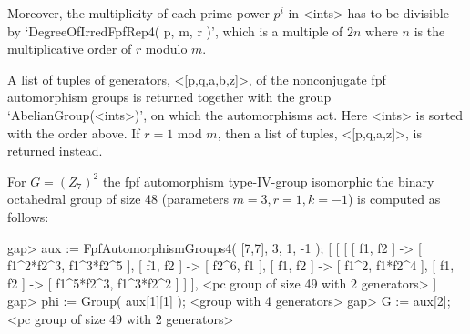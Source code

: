 Moreover, the multiplicity of each prime power $p^i$ in <ints> has to be
divisible by `DegreeOfIrredFpfRep4( p, m, r )', which is a multiple
of $2n$ where $n$ is the multiplicative order of $r$ modulo $m$.

A list of tuples of generators, <[p,q,a,b,z]>, of the nonconjugate fpf 
automorphism groups is returned together with the group 
`AbelianGroup(<ints>)', on which the automorphisms act.
Here <ints> is sorted with the order above. 
If $r = 1$ mod $m$, then a list of tuples, <[p,q,a,z]>, is returned instead.

For $G = (Z_{7})^2$ the fpf automorphism type-IV-group isomorphic the binary
octahedral group of size 48 (parameters $m = 3, r = 1, k = -1$)
is computed as follows:

\beginexample
    gap> aux := FpfAutomorphismGroups4( [7,7], 3, 1, -1 );
    [ [ [ [ f1, f2 ] -> [ f1^2*f2^3, f1^3*f2^5 ], 
              [ f1, f2 ] -> [ f2^6, f1 ], [ f1, f2 ] -> [ f1^2, f1*f2^4 ], 
              [ f1, f2 ] -> [ f1^5*f2^3, f1^3*f2^2 ] ] ], 
      <pc group of size 49 with 2 generators> ]
    gap> phi := Group( aux[1][1] );
    <group with 4 generators>
    gap> G := aux[2];
    <pc group of size 49 with 2 generators>
\endexample

